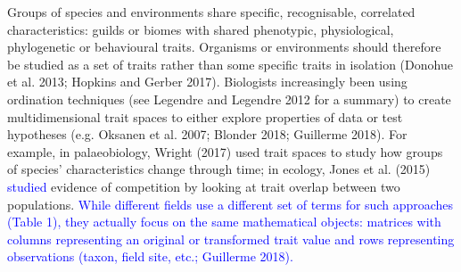 \documentclass[]{article}
\begin{document}
Groups of species and environments share specific, recognisable,
correlated characteristics: guilds or biomes with shared phenotypic,
physiological, phylogenetic or behavioural traits. Organisms or
environments should therefore be studied as a set of traits rather than
some specific traits in isolation (Donohue et al. 2013; Hopkins and
Gerber 2017). Biologists increasingly been using ordination techniques
(see Legendre and Legendre 2012 for a summary) to create
multidimensional trait spaces to either explore properties of data or
test hypotheses (e.g. Oksanen et al. 2007; Blonder 2018; Guillerme
2018). For example, in palaeobiology, Wright (2017) used trait spaces to
study how groups of species' characteristics change through time; in
ecology, Jones et al. (2015) \textcolor{blue}{ studied
} evidence of competition by looking at trait overlap between two
populations. \textcolor{blue}{ While different fields
use a different set of terms for such approaches (Table 1), they
actually focus on the same mathematical objects: matrices with columns
representing an original or transformed trait value and rows
representing observations (taxon, field site, etc.; Guillerme 2018). }

\renewcommand\baselinestretch{1}\selectfont
\end{document}
